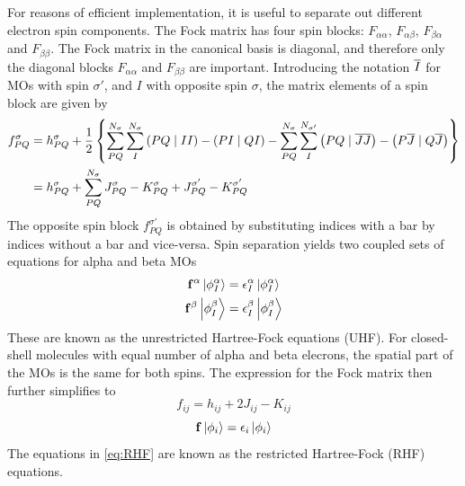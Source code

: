 For reasons of efficient implementation, it is useful to separate out different electron spin components. The Fock matrix has four spin blocks: $F_{\alpha\alpha}$, $F_{\alpha\beta}$, $F_{\beta\alpha}$ and $F_{\beta\beta}$. The Fock matrix in the canonical basis is diagonal, and therefore only the diagonal blocks  $F_{\alpha\alpha}$ and $F_{\beta\beta}$ are important. Introducing the notation $\overline{I}$ for MOs with spin $\sigma'$, and $I$ with opposite spin $\sigma$, the matrix elements of a spin block are given by
\begin{equation}
\begin{split}
f_{PQ}^{\sigma} &= h_{PQ}^{\sigma} + \frac{1}{2} \left\lbrace \sum^{N_{\sigma}}_{PQ}\sum^{N_{\sigma}}_{I} \left( PQ \mid II \right) - \left( PI \mid QI \right)  - \sum^{N_{\sigma}}_{PQ}\sum^{N_{\sigma'}}_{I} \left( PQ \mid \overline{J}\overline{J} \right) - \left( P\overline{J} \mid Q\overline{J} \right) \right\rbrace \\
&= h_{PQ}^{\sigma} + \sum^{N_{\sigma}}_{PQ} J^{\sigma}_{PQ} - K^{\sigma}_{PQ} + J^{\sigma'}_{PQ} - K^{\sigma'}_{PQ}
\end{split}
\end{equation}
\noindent The opposite spin block $f_{PQ}^{\sigma'}$ is obtained by substituting indices with a bar by indices without a bar and vice-versa. Spin separation yields two coupled sets of equations for alpha and beta MOs
\begin{equation}
\begin{split}
\mathbf{f}^{\alpha} \ket{\phi^{\alpha}_I} &= \epsilon^{\alpha}_I \ket{\phi^{\alpha}_I} \\
\mathbf{f}^{\beta} \ket{\phi^{\beta}_I} &= \epsilon^{\beta}_I \ket{\phi^{\beta}_I} 
\end{split}
\label{eq:UHF}
\end{equation} 
\noindent These are known as the unrestricted Hartree-Fock equations (UHF). For closed-shell molecules with equal number of alpha and beta elecrons, the spatial part of the MOs is the same for both spins. The expression for the Fock matrix then further simplifies to 
\begin{equation}
f_{ij} = h_{ij} + 2J_{ij} - K_{ij} 
\end{equation}
\begin{equation}
\mathbf{f} \ket{\phi_i} = \epsilon_i \ket{\phi_i}
\label{eq:RHF}
\end{equation}
\noindent The equations in \ref{eq:RHF} are known as the restricted Hartree-Fock (RHF) equations. 

